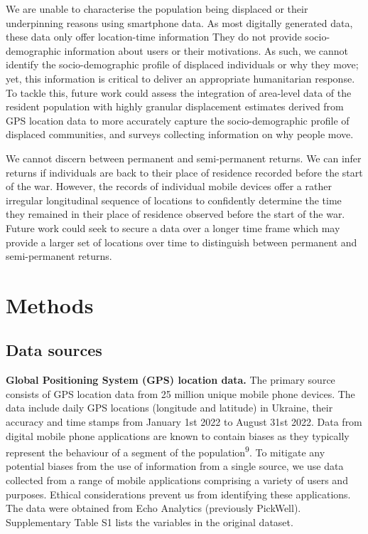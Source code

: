 \documentclass[
  11pt,
]{article}
\begin{document}
We are unable to characterise the population being displaced or their
underpinning reasons using smartphone data. As most digitally generated
data, these data only offer location-time information They do not
provide socio-demographic information about users or their motivations.
As such, we cannot identify the socio-demographic profile of displaced
individuals or why they move; yet, this information is critical to
deliver an appropriate humanitarian response. To tackle this, future
work could assess the integration of area-level data of the resident
population with highly granular displacement estimates derived from GPS
location data to more accurately capture the socio-demographic profile
of displaced communities, and surveys collecting information on why
people move.

We cannot discern between permanent and semi-permanent returns. We can
infer returns if individuals are back to their place of residence
recorded before the start of the war. However, the records of individual
mobile devices offer a rather irregular longitudinal sequence of
locations to confidently determine the time they remained in their place
of residence observed before the start of the war. Future work could
seek to secure a data over a longer time frame which may provide a
larger set of locations over time to distinguish between permanent and
semi-permanent returns.

\section{Methods}\label{methods}

\subsection{Data sources}\label{sec-data-sources}

\textbf{Global Positioning System (GPS) location data.} The primary
source consists of GPS location data from 25 million unique mobile phone
devices. The data include daily GPS locations (longitude and latitude)
in Ukraine, their accuracy and time stamps from January 1st 2022 to
August 31st 2022. Data from digital mobile phone applications are known
to contain biases as they typically represent the behaviour of a segment
of the population\textsuperscript{9}. To mitigate any potential biases
from the use of information from a single source, we use data collected
from a range of mobile applications comprising a variety of users and
purposes. Ethical considerations prevent us from identifying these
applications. The data were obtained from Echo Analytics (previously
PickWell). Supplementary Table S1 lists the variables in the original
dataset.
\end{document}
